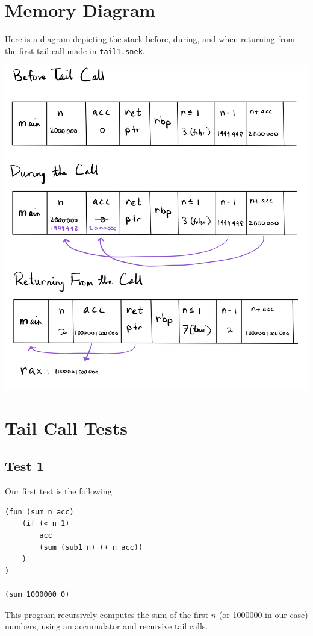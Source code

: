 \documentclass[12pt]{article}
\begin{document}
\section{Memory Diagram}
Here is a diagram depicting the stack before, during, and when returning from the first tail call made in
\verb|tail1.snek|.
\begin{center}
\includegraphics[scale=0.25]{stack.png}
\end{center}

\section{Tail Call Tests}
\subsection{Test 1}
Our first test is the following
\begin{verbatim}
(fun (sum n acc)
    (if (< n 1)
        acc
        (sum (sub1 n) (+ n acc))
    )
)

(sum 1000000 0)\end{verbatim}

This program recursively computes the sum of the first $n$ (or 1000000 in our case) numbers, 
using an accumulator and recursive tail calls. \newline
\end{document}
